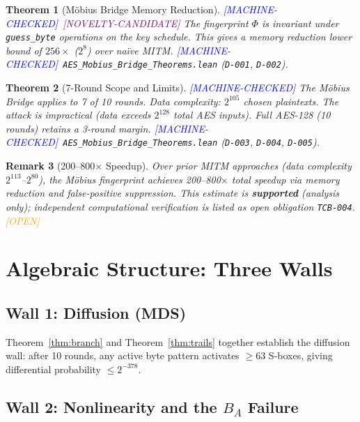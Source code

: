 \documentclass[11pt,letterpaper]{article}
\newtheorem{theorem}{Theorem}[section]
\newtheorem{remark}[theorem]{Remark}
\newcommand{\MC}{\textcolor{blue}{[MACHINE-CHECKED]}}
\newcommand{\OP}{\textcolor{orange}{[OPEN]}}
\newcommand{\CN}{\textcolor{purple}{[NOVELTY-CANDIDATE]}}
\begin{document}
\begin{theorem}[M\"obius Bridge Memory Reduction] \MC\ \CN
The fingerprint $\Phi$ is invariant under \texttt{guess\_byte} operations
on the key schedule.  This gives a memory reduction lower bound of $256\times$
($2^8$) over na\"ive MITM.
\MC\ \texttt{AES\_Mobius\_Bridge\_Theorems.lean} (\texttt{D-001}, \texttt{D-002}).
\end{theorem}

\begin{theorem}[7-Round Scope and Limits] \MC
The M\"obius Bridge applies to 7 of 10 rounds.  Data complexity: $2^{105}$
chosen plaintexts.  The attack is \emph{impractical} (data exceeds $2^{128}$
total AES inputs).  Full AES-128 (10 rounds) retains a 3-round margin.
\MC\ \texttt{AES\_Mobius\_Bridge\_Theorems.lean} (\texttt{D-003}, \texttt{D-004}, \texttt{D-005}).
\end{theorem}

\begin{remark}[200--800$\times$ Speedup]
Over prior MITM approaches (data complexity $2^{113}$--$2^{80}$), the
M\"obius fingerprint achieves 200--800$\times$ total speedup via memory
reduction and false-positive suppression.
This estimate is \textbf{supported} (analysis only); independent
computational verification is listed as open obligation \texttt{TCB-004}.
\OP
\end{remark}

\section{Algebraic Structure: Three Walls}
\label{sec:algebra}

\subsection{Wall 1: Diffusion (MDS)}

Theorem~\ref{thm:branch} and Theorem~\ref{thm:trails} together establish
the diffusion wall: after 10 rounds, any active byte pattern activates
$\geq 63$ S-boxes, giving differential probability $\leq 2^{-378}$.

\subsection{Wall 2: Nonlinearity and the $B_A$ Failure}
\end{document}
